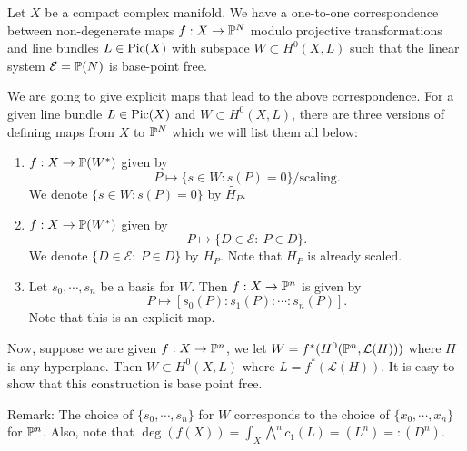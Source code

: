 Let $X$ be a compact complex manifold. We have a one-to-one correspondence between non-degenerate maps $f:X\to {\mathbb P}^N$ modulo projective transformations and line bundles $L\in \operatorname{Pic}(X)$ with subspace $W\subset H^0(X,L)$ such that the linear system $\mathcal{E}={\mathbb P}(N)$ is base-point free. 

We are going to give explicit maps that lead to the above correspondence. For a given line bundle $L\in \operatorname{Pic}(X)$ and $W\subset H^0(X,L)$, there are three versions of defining maps from $X$ to ${\mathbb P}^N$ which we will list them all below:

\begin{enumerate}
\item $f:X\to {\mathbb P}(W^*)$ given by 
$$P\mapsto \{s\in W: s(P)=0\}/\text{scaling}.$$
We denote $\{s\in W: s(P)=0\}$ by $\tilde{H_P}$. 
\item $f:X\to {\mathbb P}(W^*)$ given by
$$P\mapsto \{D\in \mathcal{E}:\ P\in D\}.$$
We denote $\{D\in \mathcal{E}:\ P\in D\}$ by $H_P$. Note that $H_P$ is already scaled.
\item Let $s_0,\cdots, s_n$ be a basis for $W$. Then $f:X\to {\mathbb P}^n$ is given by
$$P\mapsto [s_0(P):s_1(P):\cdots:s_n(P)].$$
Note that this is an explicit map. 
\end{enumerate}

Now, suppose we are given $f:X\to {\mathbb P}^n$, we let $W=f^*(H^0({\mathbb P}^n,\mathcal{L}(H)))$ where $H$ is any hyperplane. Then $W\subset H^0(X,L)$ where $L=f^*(\mathcal{L}(H))$. It is easy to show that this construction is base point free. 

Remark: The choice of $\{s_0,\cdots, s_n\}$ for $W$ corresponds to the choice of $\{x_0,\cdots,x_n\}$ for ${\mathbb P}^n$. Also, note that $\deg(f(X))=\int_X \bigwedge^n c_1(L)=(L^n)=:(D^n)$. 
